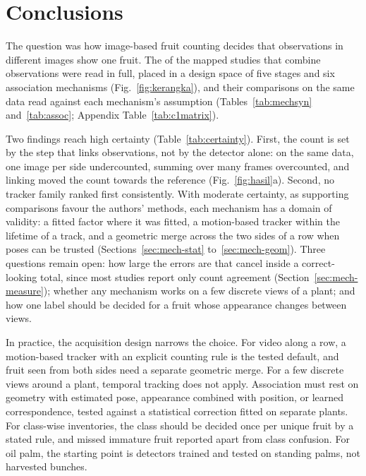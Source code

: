 \section{Conclusions}\label{sec:conclusion}

The question was how image-based fruit counting decides that observations in different images show one fruit. The \nMulti of the \nIncluded mapped studies that combine observations were read in full, placed in a design space of five stages and six association mechanisms (Fig.~\ref{fig:kerangka}), and their comparisons on the same data read against each mechanism's assumption (Tables~\ref{tab:mechsyn} and~\ref{tab:assoc}; Appendix Table~\ref{tab:c1matrix}).

Two findings reach high certainty (Table~\ref{tab:certainty}). First, the count is set by the step that links observations, not by the detector alone: on the same data, one image per side undercounted, summing over many frames overcounted, and linking moved the count towards the reference (Fig.~\ref{fig:hasil}a). Second, no tracker family ranked first consistently. With moderate certainty, as supporting comparisons favour the authors' methods, each mechanism has a domain of validity: a fitted factor where it was fitted, a motion-based tracker within the lifetime of a track, and a geometric merge across the two sides of a row when poses can be trusted (Sections~\ref{sec:mech-stat} to~\ref{sec:mech-geom}). Three questions remain open: how large the errors are that cancel inside a correct-looking total, since most studies report only count agreement (Section~\ref{sec:mech-measure}); whether any mechanism works on a few discrete views of a plant; and how one label should be decided for a fruit whose appearance changes between views.

In practice, the acquisition design narrows the choice. For video along a row, a motion-based tracker with an explicit counting rule is the tested default, and fruit seen from both sides need a separate geometric merge. For a few discrete views around a plant, temporal tracking does not apply. Association must rest on geometry with estimated pose, appearance combined with position, or learned correspondence, tested against a statistical correction fitted on separate plants. For class-wise inventories, the class should be decided once per unique fruit by a stated rule, and missed immature fruit reported apart from class confusion. For oil palm, the starting point is detectors trained and tested on standing palms, not harvested bunches.

